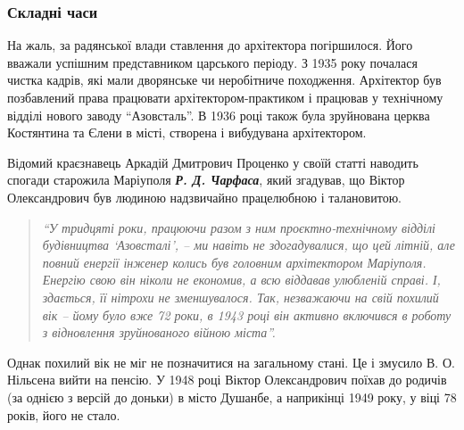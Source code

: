  
 
 
 
 

\subsubsection{Складні часи}

На жаль, за радянської влади ставлення до архітектора погіршилося. Його вважали
успішним представником царського періоду. З 1935 року почалася чистка кадрів,
які мали дворянське чи неробітниче походження. Архітектор був позбавлений права
працювати архітектором-практиком і працював у технічному відділі нового заводу
\enquote{Азовсталь}. В 1936 році також була зруйнована церква Костянтина та Єлени в
місті, створена і вибудувана архітектором.

Відомий краєзнавець Аркадій Дмитрович Проценко у своїй статті наводить спогади
старожила Маріуполя \emph{\textbf{Р. Д. Чарфаса}}, який згадував, що Віктор Олександрович був
людиною надзвичайно працелюбною і талановитою. 

\begin{quote}
\em\enquote{У тридцяті роки, працюючи разом
з ним проєктно-технічному відділі будівництва \enquote{Азовсталі}, – ми навіть не
здогадувалися, що цей літній, але повний енергії інженер колись був головним
архітектором Маріуполя. Енергію свою він ніколи не економив, а всю віддавав
улюбленій справі. І, здається, її нітрохи не зменшувалося. Так, незважаючи на
свій похилий вік – йому було вже 72 роки, в 1943 році він активно включився в
роботу з відновлення зруйнованого війною міста}.
\end{quote}

Однак похилий вік не міг не позначитися на загальному стані. Це і змусило В. О.
Нільсена вийти на пенсію. У 1948 році Віктор Олександрович поїхав до родичів
(за однією з версій до доньки) в місто Душанбе, а наприкінці 1949 року, у віці
78 років, його не стало.
